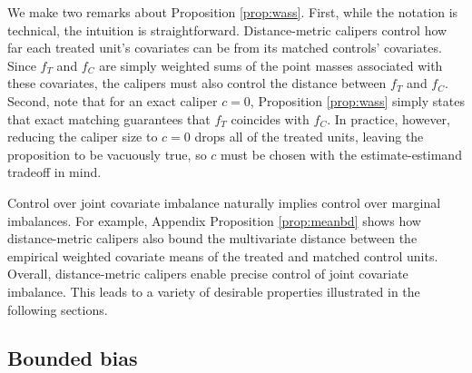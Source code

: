 \documentclass{article}
\newcommand{\Xt}{\mathbf{X}_t}
\newcommand{\Xj}{\mathbf{X}_j}
\begin{document}
We make two remarks about Proposition \ref{prop:wass}.
First, while the notation is technical, the intuition is straightforward.
Distance-metric calipers control how far each treated unit's covariates can be from its matched controls' covariates.
Since $f_T$ and $f_C$ are simply weighted sums of the point masses associated with these covariates, the calipers must also control the distance between $f_T$ and $f_C$.
Second, note that for an exact caliper $c=0$, Proposition \ref{prop:wass} simply states that exact matching guarantees that $f_T$ coincides with $f_C$.
In practice, however, reducing the caliper size to $c=0$ drops all of the treated units, leaving the proposition to be vacuously true, so $c$ must be chosen with the estimate-estimand tradeoff in mind.

Control over joint covariate imbalance naturally implies control over marginal imbalances.
For example, Appendix Proposition \ref{prop:meanbd} shows how distance-metric calipers also bound the multivariate distance between the empirical weighted covariate means of the treated and matched control units.
Overall, distance-metric calipers enable precise control of joint covariate imbalance.
This leads to a variety of desirable properties illustrated in the following sections.


\subsection{Bounded bias}
\label{sec:biasbd}
\end{document}
